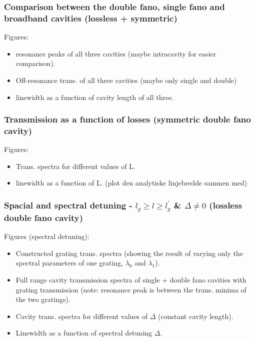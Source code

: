 \subsubsection{Comparison between the double fano, single fano and broadband cavities (lossless + symmetric)}

Figures:
\begin{itemize}
    \item resonance peaks of all three cavities (maybe intracavity for easier comparison).
    \item Off-resonance trans. of all three cavities (maybe only single and double)
    \item linewidth as a function of cavity length of all three.
\end{itemize}

\subsubsection{Transmission as a function of losses (symmetric double fano cavity)}

Figures:
\begin{itemize}
    \item Trans. spectra for different values of L.
    \item linewidth as a function of L. (plot den analytiske linjebredde sammen med)
\end{itemize}

\subsubsection{Spacial and spectral detuning - $l_{g} \geq l \geq l_{g}^{\prime}$ \& $\Delta \neq 0$ (lossless double fano cavity)}

Figures (spectral detuning): 
\begin{itemize}
    \item Constructed grating trans. spectra (showing the result of varying only the spectral parameters of one grating, $\lambda_0$ and $\lambda_1$).
    \item Full range cavity transmission spectra of single + double fano cavities with grating transmission (note: resonance peak is between the trans. minima of the two gratings).
    \item Cavity trans. spectra for different values of $\Delta$ (constant cavity length).
    \item Linewidth as a function of spectral detuning $\Delta$.
\end{itemize}

